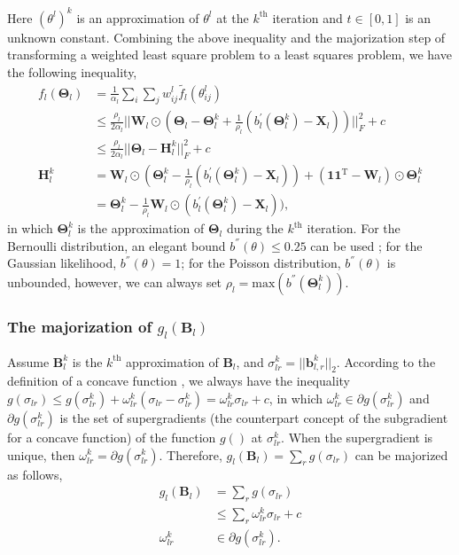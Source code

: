 Here $(\theta^{l})^k$ is an approximation of $\theta^{l}$ at the $k^{\text{th}}$ iteration and $t\in[0,1]$ is an unknown constant. Combining the above inequality and the majorization step \cite{kiers1997weighted} of transforming a weighted least square problem to a least squares problem, we have the following inequality,
\begin{equation}\label{chapter5_eq:4}
\begin{aligned}
     f_l(\mathbf{\Theta}_l) &= \frac{1}{\alpha_l} \sum_{i}\sum_{j} w_{ij}^{l} \tilde{f_l}(\theta_{ij}^{l})\\
     &\leq \frac{\rho_l}{2\alpha_l} ||\mathbf{W}_l \odot (\mathbf{\Theta}_l - \mathbf{\Theta}_l^k + \frac{1}{\rho_l}(b_l^{'}(\mathbf{\Theta}_{l}^{k}) - \mathbf{X}_l)) ||_F^2 + c\\
     &\leq 	\frac{\rho_l}{2\alpha_l} ||\mathbf{\Theta}_l - \mathbf{H}_{l}^{k}||_F^2 + c \\
\mathbf{H}_{l}^{k} &= \mathbf{W}_l \odot(\mathbf{\Theta}_l^k - \frac{1}{\rho_l} (b_l^{'}(\mathbf{\Theta}_{l}^{k}) - \mathbf{X}_l)) + (\mathbf{1}\mathbf{1}^{\text{T}}-\mathbf{W}_l)\odot \mathbf{\Theta}_l^k \\
&= \mathbf{\Theta}_l^k - \frac{1}{\rho_l} \mathbf{W}_l \odot (b_l^{'}(\mathbf{\Theta}_{l}^{k}) - \mathbf{X}_l)), 	
\end{aligned}
\end{equation}
in which $\mathbf{\Theta}_l^k$ is the approximation of $\mathbf{\Theta}_l$ during the $k^{\text{th}}$ iteration. For the Bernoulli distribution, an elegant bound $b^{''}(\theta) \leq 0.25$ can be used \cite{de2006principal}; for the Gaussian likelihood, $b^{''}(\theta) = 1$; for the Poisson distribution, $b^{''}(\theta)$ is unbounded, however, we can always set $\rho_l = \text{max}(b^{''}(\mathbf{\Theta}_l^k))$.

\subsubsection*{The majorization of $g_l(\mathbf{B}_l)$}
Assume $\mathbf{B}_l^k$ is the $k^{\text{th}}$ approximation of $\mathbf{B}_l$, and $\sigma_{lr}^k = ||\mathbf{b}_{l,r}^k||_2$. According to the definition of a concave function \cite{boyd2004convex}, we always have the inequality $g(\sigma_{lr}) \leq g(\sigma_{lr}^k) + \omega_{lr}^k(\sigma_{lr} - \sigma_{lr}^k) = \omega_{lr}^k \sigma_{lr} + c$, in which $\omega_{lr}^k \in \partial g(\sigma_{lr}^k)$ and $\partial g(\sigma_{lr}^k)$ is the set of supergradients (the counterpart concept of the subgradient for a concave function) of the function $g()$ at $\sigma_{lr}^k$. When the supergradient is unique, then $\omega_{lr}^k = \partial g(\sigma_{lr}^k)$. Therefore, $g_l(\mathbf{B}_l) = \sum_{r} g(\sigma_{lr})$ can be majorized as follows,
\begin{equation}\label{chapter5_eq:5}
\begin{aligned}
g_l(\mathbf{B}_l) &= \sum_{r} g(\sigma_{lr})\\
              &\leq \sum_{r} \omega_{lr}^k \sigma_{lr} + c\\
       \omega_{lr}^k &\in \partial g(\sigma_{lr}^k).
\end{aligned}
\end{equation}

